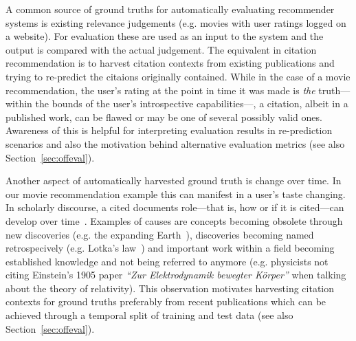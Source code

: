 
A common source of ground truths for automatically evaluating recommender systems is existing relevance judgements (e.g. movies with user ratings logged on a website). For evaluation these are used as an input to the system and the output is compared with the actual judgement. The equivalent in citation recommendation is to harvest citation contexts from existing publications and trying to re-predict the citaions originally contained. While in the case of a movie recommendation, the user's rating at the point in time it was made is \emph{the} truth---within the bounds of the user's introspective capabilities---, a citation, albeit in a published work, can be flawed or may be one of several possibly valid ones. Awareness of this is helpful for interpreting evaluation results in re-prediction scenarios and also the motivation behind alternative evaluation metrics (see also Section~\ref{sec:offeval}).

Another aspect of automatically harvested ground truth is change over time. In our movie recommendation example this can manifest in a user's taste changing. In scholarly discourse, a cited documents role---that is, how or if it is cited---can develop over time~\cite{Swales1986,He2018}. Examples of causes are concepts becoming obsolete through new discoveries (e.g. the expanding Earth~\cite{Wu2011}), discoveries becoming named retrospecively (e.g. Lotka's law~\cite{Potter1981}) and important work within a field becoming established knowledge and not being referred to anymore (e.g. physicists not citing Einstein's 1905 paper \emph{``Zur Elektrodynamik bewegter Körper''} when talking about the theory of relativity). This observation motivates harvesting citation contexts for ground truths preferably from recent publications which can be achieved through a temporal split of training and test data (see also Section~\ref{sec:offeval}).



